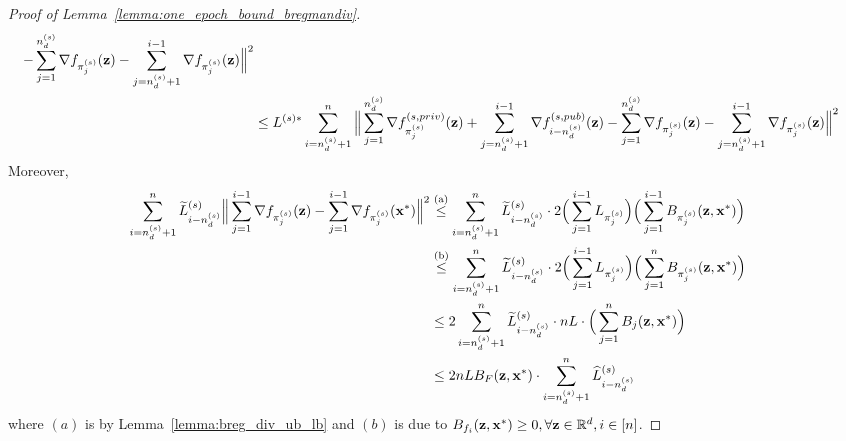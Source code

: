 \begin{proof}[Proof of Lemma~\ref{lemma:one_epoch_bound_bregmandiv}]
\begin{align}
            - \sum_{j=1}^{n_d^{(s)}} \nabla f_{\pi_j^{(s)}}({\mathbf{z}}) - \sum_{j=n_d^{(s)}+1}^{i-1} \nabla f_{\pi_j^{(s)}}({\mathbf{z}})
        \Big\|^2\\
        \nonumber
        &\leq L^{(s)*} \sum_{i=n_d^{(s)} + 1}^{n} \Big\| \sum_{j=1}^{n_d^{(s)}} \nabla f_{\pi_j^{(s)}}^{(s, priv)}({\mathbf{z}}) + \sum_{j=n_d^{(s)}+1}^{i-1} \nabla f_{i-n_d^{(s)}}^{(s, pub)}({\mathbf{z}})
            - \sum_{j=1}^{n_d^{(s)}} \nabla f_{\pi_j^{(s)}}({\mathbf{z}}) - \sum_{j=n_d^{(s)}+1}^{i-1} \nabla f_{\pi_j^{(s)}}({\mathbf{z}})
        \Big\|^2
    \end{align}
    Moreover,
    \begin{align}
        \sum_{i=n_d^{(s)}+1}^{n}\widetilde{L}_{i-n_d^{(s)}}^{(s)}
        \Big\| \sum_{j=1}^{i-1} \nabla f_{\pi_j^{(s)}}({\mathbf{z}})
            - \sum_{j=1}^{i-1} \nabla f_{\pi_j^{(s)}}({\mathbf{x}}^*) \Big\|^2
        &\stackrel{\text{(a)}}{\leq} \sum_{i= n_d^{(s)}+1}^{n} \widetilde{L}_{i-n_d^{(s)}}^{(s)} \cdot 2\Big( \sum_{j=1}^{i-1} L_{\pi_j^{(s)}} \Big) \Big( \sum_{j=1}^{i-1} B_{\pi_j^{(s)}}({\mathbf{z}}, {\mathbf{x}}^*)
        \Big)\\
        &\stackrel{\text{(b)}}{\leq} \sum_{i=n_d^{(s)}+1}^{n} \widetilde{L}_{i-n_d^{(s)}}^{(s)} \cdot 2\Big( \sum_{j=1}^{i-1} L_{\pi_j^{(s)}} \Big)
        \Big( \sum_{j=1}^{n} B_{\pi_j^{(s)}}({\mathbf{z}}, {\mathbf{x}}^*) \Big)\\
        &\leq 2 \sum_{i=n_d^{(s)}+1}^{n} \widetilde{L}_{i-n_d^{(s)}}^{(s)} \cdot n L \cdot \Big( \sum_{j=1}^{n} B_{j}({\mathbf{z}}, {\mathbf{x}}^*) \Big)\\
    \label{eq:breg_diff_term_2_pub}
        &\leq 2 n L B_F({\mathbf{z}}, {\mathbf{x}}^*) \cdot \sum_{i=n_d^{(s)}+1}^{n} \widehat{L}_{i-n_d^{(s)}}^{(s)}
    \end{align}
    where $(a)$ is by Lemma~\ref{lemma:breg_div_ub_lb} and $(b)$ is due to $B_{f_i}({\mathbf{z}}, {\mathbf{x}}^*) \geq 0, \forall {\mathbf{z}}\in\mathbb{R}^{d}, i\in [n]$.
    

\end{proof}
